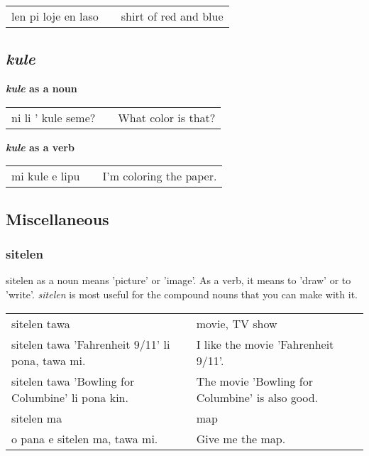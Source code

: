 \begin{supertabular}{p{5,5cm}|ll}
len pi loje en laso && shirt of red and blue \\
\end{supertabular} 
%
\subsection*{\textit{kule}}
%
\textbf{\textit{kule} as a noun} \\
\begin{supertabular}{p{5,5cm}|ll}
ni li ' kule seme? && What color is that? \\
\end{supertabular} 

\textbf{\textit{kule} as a verb} \\
\begin{supertabular}{p{5,5cm}|ll}
mi kule e lipu && I'm coloring the paper. \\
\end{supertabular} 
%
\subsection*{Miscellaneous}
\subsubsection*{sitelen}
%
sitelen as a noun means 'picture' or 'image'. 
As a verb, it means to 'draw' or to 'write'. 
\textit{sitelen} is most useful for the compound nouns that you can make with it. 

\begin{supertabular}{p{5,5cm}|ll}
sitelen tawa  && movie, TV show \\
sitelen tawa 'Fahrenheit 9/11' li pona, tawa mi. && I like the movie 'Fahrenheit 9/11'. \\
sitelen tawa 'Bowling for Columbine' li pona kin. && The movie 'Bowling for Columbine' is also good. \\
sitelen ma && map \\
o pana e sitelen ma, tawa mi. && Give me the map. \\
\end{supertabular} 
%
\newpage
